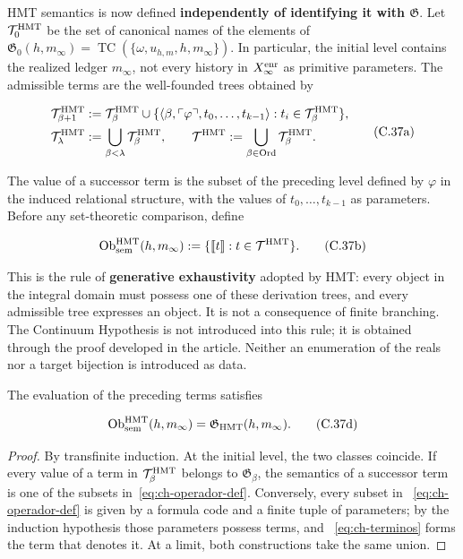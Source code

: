 HMT semantics is now defined \textbf{independently of identifying it with
\(\mathfrak G\)}. Let \(\mathcal T_0^{\rm HMT}\) be the set of canonical names
of the elements of
\(\mathfrak G_0(h,m_\infty)=
\operatorname{TC}(\{\omega,u_{h,m},h,m_\infty\})\). In particular, the
initial level contains the realized ledger \(m_\infty\), not every history
in \(X_\infty^{\rm enr}\) as primitive parameters. The admissible terms are
the well-founded trees obtained by

\[
 \begin{aligned}
 \mathcal T^{\rm HMT}_{\beta+1}
 &:={\mathcal T}^{\rm HMT}_\beta\cup
 \{\langle\beta,\ulcorner\varphi\urcorner,
       t_0,\ldots,t_{k-1}\rangle:
       t_i\in\mathcal T^{\rm HMT}_\beta\},\\
 \mathcal T^{\rm HMT}_\lambda&:=
       \bigcup_{\beta<\lambda}\mathcal T^{\rm HMT}_\beta,
 \qquad
 \mathcal T^{\rm HMT}:=
       \bigcup_{\beta\in\operatorname{Ord}}\mathcal T^{\rm HMT}_\beta.
 \end{aligned}
\tag{C.37a}\label{eq:ch-terminos}
\]

The value of a successor term is the subset of the preceding level defined by
\(\varphi\) in the induced relational structure, with the values of
\(t_0,\ldots,t_{k-1}\) as parameters. Before any set-theoretic comparison,
define

\[
 \operatorname{Ob}_{\rm sem}^{\rm HMT}(h,m_\infty)
 :=\{\llbracket t\rrbracket:t\in\mathcal T^{\rm HMT}\}.
\tag{C.37b}\label{eq:ch-objetos-semanticos}
\]

This is the rule of \textbf{generative exhaustivity} adopted by HMT: every
object in the integral domain must possess one of these derivation trees, and
every admissible tree expresses an object. It is not a consequence of finite
branching. The Continuum Hypothesis is not introduced into this rule; it is
obtained through the proof developed in the article. Neither an enumeration of
the reals nor a target bijection is introduced as data.

\begin{theorem}
\label{thm:ch-6a}
The evaluation of the preceding terms satisfies

\[
 \operatorname{Ob}_{\rm sem}^{\rm HMT}(h,m_\infty)
 =\mathfrak G_{\rm HMT}(h,m_\infty).
\tag{C.37d}\label{eq:ch-equivalencia-semantica}
\]

\end{theorem}
\begin{proof}
By transfinite induction. At the initial level, the two classes coincide. If
every value of a term in \(\mathcal T^{\rm HMT}_\beta\) belongs to
\(\mathfrak G_\beta\), the semantics of a successor term is one of the subsets
in~\eqref{eq:ch-operador-def}. Conversely, every subset in
~\eqref{eq:ch-operador-def} is given by a formula code and a finite tuple of
parameters; by the induction hypothesis those parameters possess terms, and
~\eqref{eq:ch-terminos} forms the term that denotes it. At a limit, both
constructions take the same union.
\end{proof}

